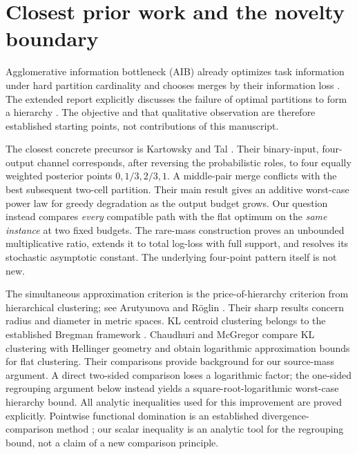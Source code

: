 \documentclass[11pt]{article}
\theoremstyle{remark}\newtheorem{remark}[theorem]{Remark}
\begin{document}
\section{Closest prior work and the novelty boundary}
Agglomerative information bottleneck (AIB) already optimizes task information
under hard partition cardinality and chooses merges by their information loss
\cite{slonim1999}. The extended report explicitly discusses the failure of
optimal partitions to form a hierarchy \cite[Section 3.1]{slonimreport}.
The objective and that qualitative observation are therefore established
starting points, not contributions of this manuscript.

The closest concrete precursor is Kartowsky and Tal
\cite[Section III-A, Example 1]{kartowsky2019}. Their binary-input,
four-output channel corresponds, after reversing the probabilistic roles,
to four equally weighted posterior points $0,1/3,2/3,1$. A middle-pair
merge conflicts with the best subsequent two-cell partition. Their main
result gives an additive worst-case power law for greedy degradation as the
output budget grows. Our question instead compares \emph{every} compatible
path with the flat optimum on the \emph{same instance} at two fixed budgets.
The rare-mass construction proves an unbounded multiplicative ratio, extends
it to total log-loss with full support, and resolves its stochastic
asymptotic constant. The underlying four-point pattern itself is not new.

The simultaneous approximation criterion is the price-of-hierarchy criterion
from hierarchical clustering; see Arutyunova and R\"oglin
\cite[Introduction and Section 2]{arutyunova2022,arutyunova2025}. Their sharp results
concern radius and diameter in metric spaces. KL centroid clustering belongs
to the established Bregman framework \cite[Sections 2--3]{banerjee2005}.
Chaudhuri and McGregor \cite[Theorem 8 and Lemmas 12 and 18]{chaudhuri2008}
compare KL clustering with Hellinger geometry and obtain logarithmic
approximation bounds for flat clustering. Their comparisons provide
background for our source-mass argument. A direct two-sided comparison
loses a logarithmic factor; the one-sided regrouping argument below instead
yields a square-root-logarithmic worst-case hierarchy bound. All analytic
inequalities used for this improvement are proved explicitly. Pointwise
functional domination is an established divergence-comparison method
\cite[Sections III-A and IV-B]{sason2016}; our scalar inequality is an
analytic tool for the regrouping bound, not a claim of a new comparison
principle.
\end{document}

